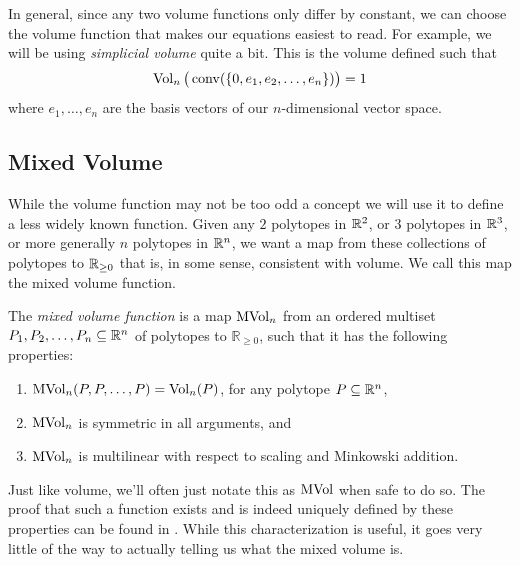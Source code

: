\documentclass[12pt,oneside]{../../sfsuthesis}
\begin{document}
In general, since any two volume functions only differ by constant, we can choose the volume function that makes our equations easiest to read.
For example, we will be using \textit{simplicial volume} quite a bit.
This is the volume defined such that
\[
    \operatorname{Vol}_n \big(\operatorname{conv}(\{0, e_1, e_2, \dots, e_n\})\big) = 1
\]
where \( e_1, \dots, e_n \) are the basis vectors of our \( n \)-dimensional vector space.

\subsection{Mixed Volume}
While the volume function may not be too odd a concept we will use it to define a less widely known function.
Given any \( 2 \) polytopes in \( \mathbb{R}^2 \), or \( 3 \) polytopes in \( \mathbb{R}^3 \), or more generally \( n \) polytopes in \( \mathbb{R}^n \), we want a map from these collections of polytopes to \( \mathbb{R}_{\geq 0} \) that is, in some sense, consistent with volume.
We call this map the mixed volume function.
\begin{definition}\th\label{def:mixedVolume}
    The \emph{mixed volume function} is a map \( \operatorname{MVol}_n \) from an ordered multiset \( P_1, P_2, \dots, P_n \subseteq \mathbb{R}^n \) of polytopes to \( \mathbb{R}_{\geq 0} \), such that it has the following properties:
    \begin{enumerate}
        \item \( \operatorname{MVol}_n(P, P, \dots, P) = \operatorname{Vol}_n(P) \), for any polytope \( P \subseteq \mathbb{R}^n \),
        \item \( \operatorname{MVol}_n \) is symmetric in all arguments, and
        \item \( \operatorname{MVol}_n \) is multilinear with respect to scaling and Minkowski addition.
    \end{enumerate}
\end{definition}
Just like volume, we'll often just notate this as \( \operatorname{MVol} \) when safe to do so.
The proof that such a function exists and is indeed uniquely defined by these properties can be found in \cite{schneiderConvexBodiesBrunn2013}.
While this characterization is useful, it goes very little of the way to actually telling us what the mixed volume is.
\end{document}
